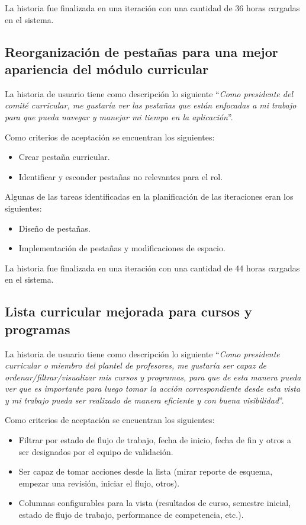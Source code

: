 La historia fue finalizada en una iteración con una cantidad de 36 horas cargadas en el sistema.

\subsection{Reorganización de pestañas para una mejor apariencia del módulo curricular}
La historia de usuario tiene como descripción lo siguiente \enquote{\textit{Como presidente del comité curricular, me gustaría ver las pestañas que están enfocadas a mi trabajo para que pueda navegar y manejar mi tiempo en la aplicación}}.

Como criterios de aceptación se encuentran los siguientes:
\begin{itemize}
	\item Crear pestaña curricular.
	\item Identificar y esconder pestañas no relevantes para el rol.
\end{itemize}

Algunas de las tareas identificadas en la planificación de las iteraciones eran los siguientes:
\begin{itemize}
	\item Diseño de pestañas.
	\item Implementación de pestañas y modificaciones de espacio.
\end{itemize}

La historia fue finalizada en una iteración con una cantidad de 44 horas cargadas en el sistema.


\subsection{Lista curricular mejorada para cursos y programas}
La historia de usuario tiene como descripción lo siguiente \enquote{\textit{Como presidente curricular o miembro del plantel de profesores, me gustaría ser capaz de ordenar/filtrar/visualizar mis cursos y programas, para que de esta manera pueda ver que es importante para luego tomar la acción correspondiente desde esta vista y mi trabajo pueda ser realizado de manera eficiente y con buena visibilidad}}.

Como criterios de aceptación se encuentran los siguientes:
\begin{itemize}
	\item Filtrar por estado de flujo de trabajo, fecha de inicio, fecha de fin y otros a ser designados por el equipo de validación.
	\item Ser capaz de tomar acciones desde la lista (mirar reporte de esquema, empezar una revisión, iniciar el flujo, otros).
	\item Columnas configurables para la vista (resultados de curso, semestre inicial, estado de flujo de trabajo, performance de competencia, etc.).
\end{itemize}

